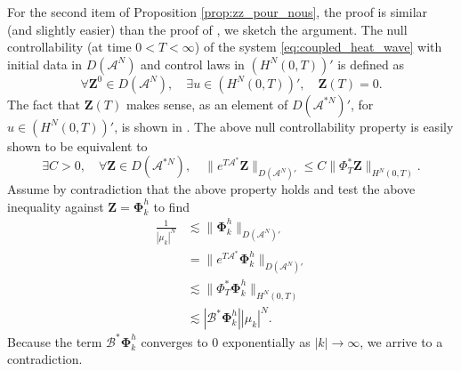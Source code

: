 \documentclass[10pt]{article}
\begin{document}
\newline
For the second item of Proposition \ref{prop:zz_pour_nous}, the proof is similar (and slightly easier) than the proof of \cite[Proposition 9]{davron_rough}, we sketch the argument. The null controllability (at time $0 < T < \infty$) of the system \eqref{eq:coupled_heat_wave} with initial data in $D(\mathcal{A}^N)$ and control laws in $(H^N(0,T))'$ is defined as 
\[
\forall \mathbf{Z}^0 \in D(\mathcal{A}^N),\quad \exists u \in (H^N(0,T))',\quad \mathbf{Z}(T) = 0.
\]
The fact that $\mathbf{Z}(T)$ makes sense, as an element of $D(\mathcal{A}^{*N})'$, for $u \in (H^N(0,T))'$, is shown in \cite[Theorem 4]{davron_rough}. The above null controllability property is easily shown \cite[Proposition 19]{davron_rough} to be equivalent to 
\[
\exists C > 0,\quad \forall \mathbf{Z} \in D(\mathcal{A}^{*N}),\quad \| e^{T \mathcal{A}^*} \mathbf{Z} \|_{D(\mathcal{A}^{N})'} \leq C \| \Phi_T^* \mathbf{Z} \|_{H^N(0,T)}. 
\]
Assume by contradiction that the above property holds and test the above inequality against $\mathbf{Z} = \mathbf{\Phi}_k^h$ to find 
\begin{align*}
    \frac{1}{|\mu_k|^N} &\lesssim \| \mathbf{\Phi}_k^h \|_{D(\mathcal{A}^N)'} \\
    &= \| e^{T \mathcal{A}^*}\mathbf{\Phi}_k^h  \|_{D(\mathcal{A}^{N})'} \\
    &\lesssim \| \Phi_T^* \mathbf{\Phi}_k^h \|_{H^N(0,T)} \\
    &\lesssim | \mathcal{B}^* \mathbf{\Phi}_k^h| |\mu_k|^N.
\end{align*}
Because the term $\mathcal{B}^* \mathbf{\Phi}_k^h$ converges to $0$ exponentially as $|k| \to \infty$, we arrive to a contradiction. 
\printbibliography
\end{document}
